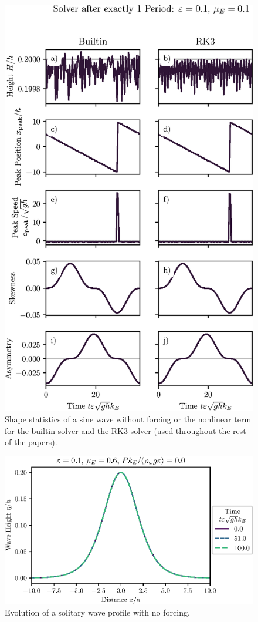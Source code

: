\documentclass{jfm}
\begin{document}
\begin{figure}
  \centering
  \includegraphics{TrigStatistics-no-NuBi.eps}
  \caption{
    Shape statistics of a sine wave without forcing or the nonlinear
    term for the builtin solver and the RK3 solver (used throughout the
    rest of the papers).
  }
\end{figure}

\begin{figure}
  \centering
  \includegraphics{Long-Run-no-NuBi.eps}
  \caption{
    Evolution of a solitary wave profile with no forcing.
  }
\end{figure}
\end{document}
